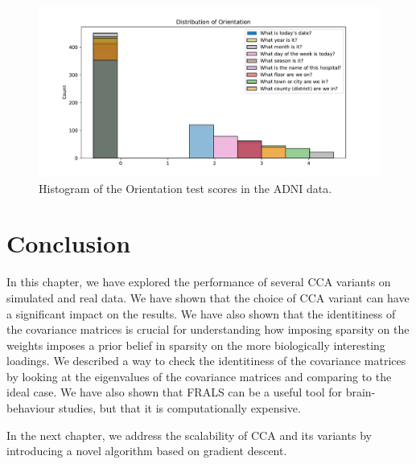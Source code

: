 \begin{figure}
\centering
\includegraphics[width=\linewidth]{figures/regularization/adni/Orientation}
\caption{Histogram of the Orientation test scores in the ADNI data.}\label{fig:adni-behavioural-data}
\end{figure}

\section{Conclusion}\label{sec:conclusion}

In this chapter, we have explored the performance of several CCA variants on simulated and real data.
We have shown that the choice of CCA variant can have a significant impact on the results.
We have also shown that the identitiness of the covariance matrices is crucial for understanding how imposing sparsity on the weights imposes a prior belief in sparsity on the more biologically interesting loadings.
We described a way to check the identitiness of the covariance matrices by looking at the eigenvalues of the covariance matrices and comparing to the ideal case.
We have also shown that FRALS can be a useful tool for brain-behaviour studies, but that it is computationally expensive.

In the next chapter, we address the scalability of CCA and its variants by introducing a novel algorithm based on gradient descent.